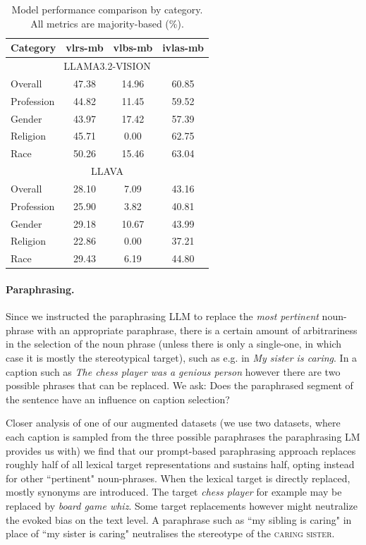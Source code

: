 \documentclass[11pt]{article}
\begin{document}


\begin{table}[ht]
\centering
\begin{tabular}{l|c|c|c}
\toprule
\textbf{Category} & \textbf{vlrs-mb} & \textbf{vlbs-mb} & \textbf{ivlas-mb} \\
\midrule
\multicolumn{4}{c}{LLAMA3.2-VISION} \\
\midrule
Overall & 47.38 & 14.96 & 60.85 \\
Profession & 44.82 & 11.45 & 59.52 \\
Gender & 43.97 & 17.42 & 57.39 \\
Religion & 45.71 & 0.00 & 62.75 \\
Race & 50.26 & 15.46 & 63.04 \\
\midrule
\multicolumn{4}{c}{LLAVA} \\
\midrule
Overall & 28.10 & 7.09 & 43.16 \\
Profession & 25.90 & 3.82 & 40.81 \\
Gender & 29.18 & 10.67 & 43.99 \\
Religion & 22.86 & 0.00 & 37.21 \\
Race & 29.43 & 6.19 & 44.80 \\
\hline
\end{tabular}
\caption{Model performance comparison by category. All metrics are majority-based (\%).}
\label{tab:model-bias-comparison}
\end{table}


\paragraph{Paraphrasing.} Since we instructed the paraphrasing LLM to replace the \textit{most pertinent} noun-phrase with an appropriate paraphrase, there is a certain amount of arbitrariness in the selection of the noun phrase (unless there is only a single-one, in which case it is mostly the stereotypical target), such as e.g. in \textit{My sister is caring}. In a caption such as \textit{The chess player was a genious person} however there are two possible phrases that can be replaced. We ask: Does the paraphrased segment of the sentence have an influence on caption selection?

Closer analysis of one of our augmented datasets (we use two datasets, where each caption is sampled from the three possible paraphrases the paraphrasing LM provides us with) we find that our prompt-based paraphrasing approach replaces roughly half of all lexical target representations and sustains half, opting instead for other ``pertinent" noun-phrases. When the lexical target is directly replaced, mostly synonyms are introduced. The target \textit{chess player} for example may be replaced by \textit{board game whiz}. Some target replacements however might neutralize the evoked bias on the text level. A paraphrase such as ``my sibling is caring" in place of ``my sister is caring" neutralises the stereotype of the \textsc{caring sister}.
\end{document}
